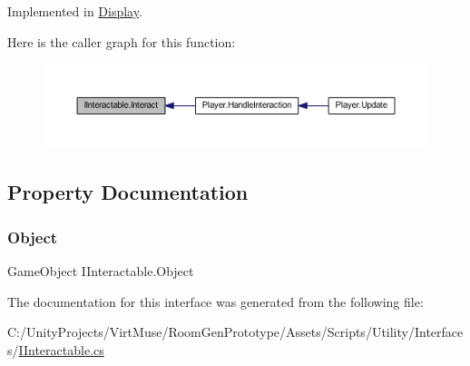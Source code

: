 Implemented in \mbox{\hyperlink{class_display_a43fc2a6f19bbf2f1bdb676392b37e921}{Display}}.

Here is the caller graph for this function\+:\nopagebreak
\begin{figure}[H]
\begin{center}
\leavevmode
\includegraphics[width=350pt]{interface_i_interactable_a736e28381ac0e7ca60f5fae2feb95afe_icgraph}
\end{center}
\end{figure}


\subsection{Property Documentation}
\mbox{\label{interface_i_interactable_a1ea155218acad8d933577fa071de48af}} 
\subsubsection{\texorpdfstring{Object}{Object}}
{\footnotesize\ttfamily Game\+Object I\+Interactable.\+Object\hspace{0.3cm}{\ttfamily [get]}}



The documentation for this interface was generated from the following file\+:\begin{DoxyCompactItemize}
\item 
C\+:/\+Unity\+Projects/\+Virt\+Muse/\+Room\+Gen\+Prototype/\+Assets/\+Scripts/\+Utility/\+Interfaces/\mbox{\hyperlink{_i_interactable_8cs}{I\+Interactable.\+cs}}\end{DoxyCompactItemize}
